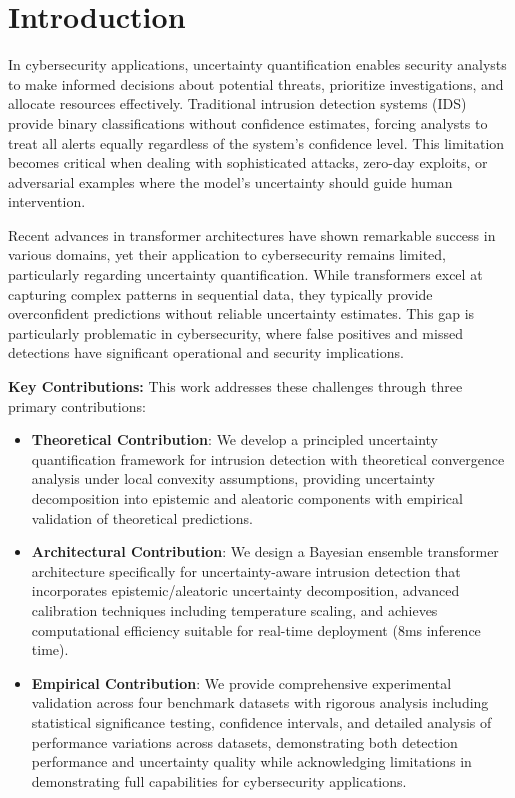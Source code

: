 \documentclass[journal]{IEEEtran}
\begin{document}
\section{Introduction}

In cybersecurity applications, uncertainty quantification enables security analysts to make informed decisions about potential threats, prioritize investigations, and allocate resources effectively. Traditional intrusion detection systems (IDS) provide binary classifications without confidence estimates, forcing analysts to treat all alerts equally regardless of the system's confidence level. This limitation becomes critical when dealing with sophisticated attacks, zero-day exploits, or adversarial examples where the model's uncertainty should guide human intervention.

Recent advances in transformer architectures have shown remarkable success in various domains, yet their application to cybersecurity remains limited, particularly regarding uncertainty quantification. While transformers excel at capturing complex patterns in sequential data, they typically provide overconfident predictions without reliable uncertainty estimates. This gap is particularly problematic in cybersecurity, where false positives and missed detections have significant operational and security implications.

\textbf{Key Contributions:} This work addresses these challenges through three primary contributions:
\begin{itemize}
\item \textbf{Theoretical Contribution}: We develop a principled uncertainty quantification framework for intrusion detection with theoretical convergence analysis under local convexity assumptions, providing uncertainty decomposition into epistemic and aleatoric components with empirical validation of theoretical predictions.
\item \textbf{Architectural Contribution}: We design a Bayesian ensemble transformer architecture specifically for uncertainty-aware intrusion detection that incorporates epistemic/aleatoric uncertainty decomposition, advanced calibration techniques including temperature scaling, and achieves computational efficiency suitable for real-time deployment (8ms inference time).
\item \textbf{Empirical Contribution}: We provide comprehensive experimental validation across four benchmark datasets with rigorous analysis including statistical significance testing, confidence intervals, and detailed analysis of performance variations across datasets, demonstrating both detection performance and uncertainty quality while acknowledging limitations in demonstrating full capabilities for cybersecurity applications.
\end{itemize}
\end{document}
